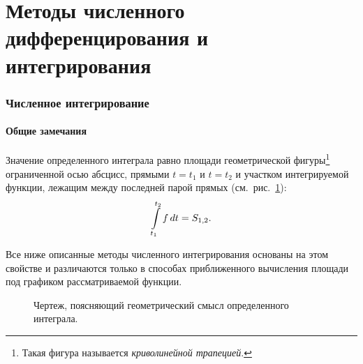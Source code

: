 \documentclass[12pt,a4paper,openany]{extarticle}
\begin{document}
\part*{Методы численного дифференцирования и интегрирования}

\section{Численное интегрирование}
\subsection{Общие замечания}
\hspace*{\parindent}Значение определенного интеграла равно площади геометрической фигуры\lefteqn{,}\footnote{Такая фигура называется \textit{криволинейной трапецией}.} ограниченной осью абсцисс, прямыми $t = t_1$ и $t = t_2$ и участком интегрируемой функции, лежащим между последней парой прямых (см.~рис.~\ref{fig:geom_mean_integral}):
\begin{equation}
\int\limits_{t_1}^{t_2} f\,dt = S_{1,2}\ldotp
\end{equation}

Все ниже описанные методы численного интегрирования основаны на этом свойстве и различаются только в способах приближенного вычисления площади под графиком рассматриваемой функции.

\begin{figure}[h!]
	\caption{Чертеж, поясняющий геометрический смысл определенного интеграла.}
	\label{fig:geom_mean_integral}
\end{figure}
\end{document}
